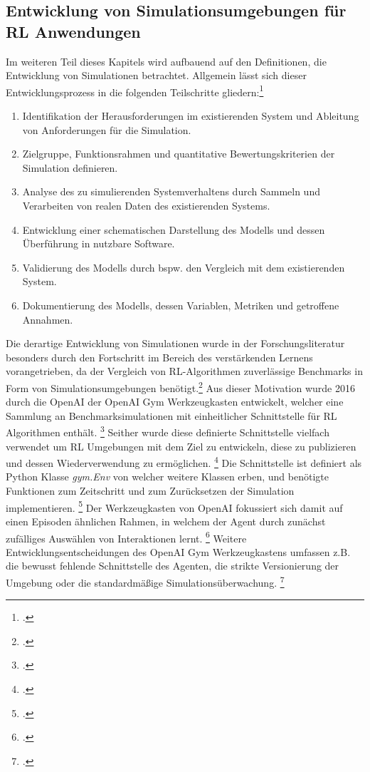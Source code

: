 \subsection{Entwicklung von Simulationsumgebungen für RL Anwendungen}
Im weiteren Teil dieses Kapitels wird aufbauend auf den Definitionen, die Entwicklung von Simulationen betrachtet.
Allgemein lässt sich dieser Entwicklungsprozess in die folgenden Teilschritte gliedern:\footcite[Vgl.][S. 8f.]{Maria.1997}
\begin{enumerate}
    \item Identifikation der Herausforderungen im existierenden System und Ableitung von Anforderungen für die Simulation.
    \item Zielgruppe, Funktionsrahmen und quantitative Bewertungskriterien der Simulation definieren.
    \item Analyse des zu simulierenden Systemverhaltens durch Sammeln und Verarbeiten von realen Daten des existierenden Systems.
    \item Entwicklung einer schematischen Darstellung des Modells und dessen Überführung in nutzbare Software.
    \item Validierung des Modells durch bspw. den Vergleich mit dem existierenden System.
    \item Dokumentierung des Modells, dessen Variablen, Metriken und getroffene Annahmen.
\end{enumerate}

Die derartige Entwicklung von Simulationen wurde in der Forschungsliteratur besonders durch den Fortschritt im Bereich des verstärkenden Lernens vorangetrieben, da der Vergleich von RL-Algorithmen zuverlässige Benchmarks in Form von Simulationsumgebungen benötigt.\footcite[Vgl.][S. 1]{Brockman.2016}
Aus dieser Motivation wurde 2016 durch die OpenAI der OpenAI Gym Werkzeugkasten entwickelt, welcher eine Sammlung an Benchmarksimulationen mit einheitlicher Schnittstelle für RL Algorithmen enthält. \footcite[Vgl.][S. 1]{Brockman.2016}
Seither wurde diese definierte Schnittstelle vielfach verwendet um RL Umgebungen mit dem Ziel zu entwickeln, diese zu publizieren und dessen Wiederverwendung zu ermöglichen. \footcite[Vgl.][S. 4]{Schuderer.2021}
Die Schnittstelle ist definiert als Python Klasse \textit{gym.Env} von welcher weitere Klassen erben, und benötigte Funktionen zum Zeitschritt und zum Zurücksetzen der Simulation implementieren. \footcite[Vgl.][S. 4]{Schuderer.2021}
Der Werkzeugkasten von OpenAI fokussiert sich damit auf einen Episoden ähnlichen Rahmen, in welchem der Agent durch zunächst zufälliges Auswählen von Interaktionen lernt. \footcite[Vgl.][S. 1]{Brockman.2016}
Weitere Entwicklungsentscheidungen des OpenAI Gym Werkzeugkastens umfassen z.B. die bewusst fehlende Schnittstelle des Agenten, die strikte Versionierung der Umgebung oder die standardmäßige Simulationsüberwachung. \footcite[Vgl.][S. 2f.]{Brockman.2016}

